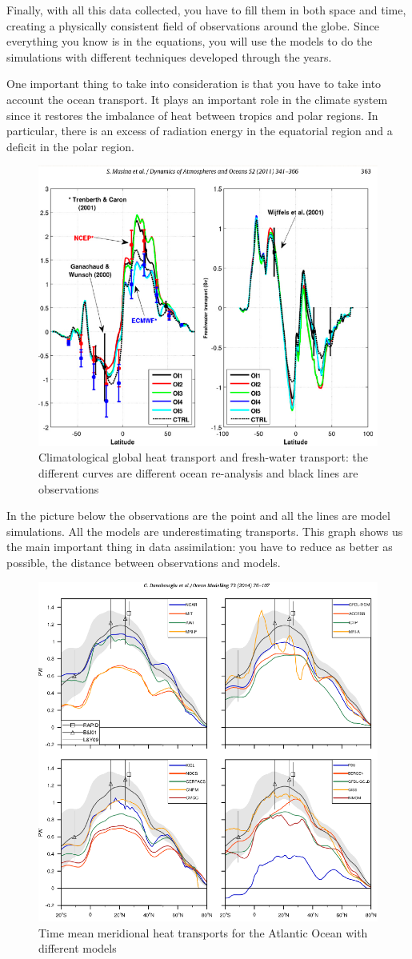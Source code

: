 Finally, with all this data collected, you have to fill them in both space and time, creating a physically consistent field of observations around the globe. Since everything you know is in the equations, you will use the models to do the simulations with different techniques developed through the years. 

One important thing to take into consideration is that you have to take into account the ocean transport. It plays an important role in the climate system since it restores the imbalance of heat between tropics and polar regions. In particular, there is an excess of radiation energy in the equatorial region and a deficit in the polar region. 

\begin{figure}[h!]
    \centering
    \includegraphics[width=0.5\linewidth]{uploads/image8.png}
    \caption{Climatological global heat transport and fresh-water transport: the different curves are different ocean re-analysis and black lines are observations}
    \label{fig:enter-label}
\end{figure}

In the picture below the observations are the point and all the lines are model simulations. All the models are underestimating transports.
This graph shows us the main important thing in data assimilation: you have to reduce as better as possible, the distance between observations and models. 
\begin{figure}[h!]
    \centering
    \includegraphics[width=0.5\linewidth]{uploads/image9.png}
    \caption{Time mean meridional heat transports for the Atlantic Ocean with different models}
    \label{fig:enter-label}
\end{figure}

